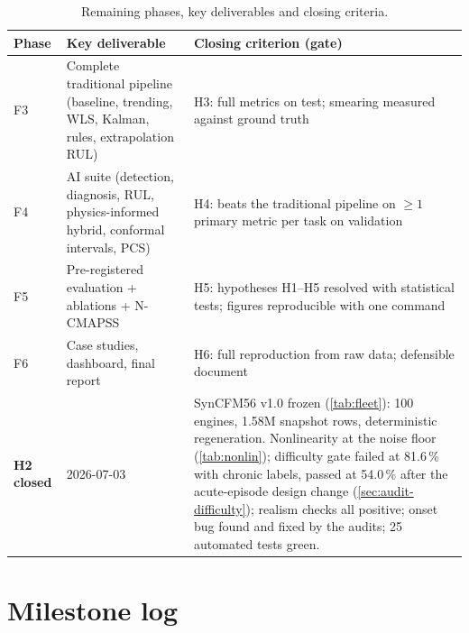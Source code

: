 \begin{table}[htbp]
  \centering\small
  \caption{Remaining phases, key deliverables and closing criteria.}
  \label{tab:remaining-phases}
  \begin{tabular}{p{}p{}p{}}
    \toprule
    Phase & Key deliverable & Closing criterion (gate) \\
    \midrule
    F3 & Complete traditional pipeline (baseline, trending, WLS, Kalman, rules, extrapolation
         RUL) &
         H3: full metrics on test; smearing measured against ground truth \\
    F4 & AI suite (detection, diagnosis, RUL, physics-informed hybrid, conformal intervals,
         PCS) &
         H4: beats the traditional pipeline on $\geq1$ primary metric per task on validation \\
    F5 & Pre-registered evaluation + ablations + N-CMAPSS &
         H5: hypotheses H1--H5 resolved with statistical tests; figures reproducible with one
         command \\
    F6 & Case studies, dashboard, final report &
         H6: full reproduction from raw data; defensible document \\
    \textbf{H2 closed} & 2026-07-03 & SynCFM56 v1.0 frozen (\cref{tab:fleet}): 100 engines,
      1.58M snapshot rows, deterministic regeneration. Nonlinearity at the noise floor
      (\cref{tab:nonlin}); difficulty gate failed at 81.6\,\% with chronic labels, passed at
      54.0\,\% after the acute-episode design change (\cref{sec:audit-difficulty}); realism
      checks all positive; onset bug found and fixed by the audits; 25 automated tests green. \\
    \bottomrule
  \end{tabular}
\end{table}

\section{Milestone log}

